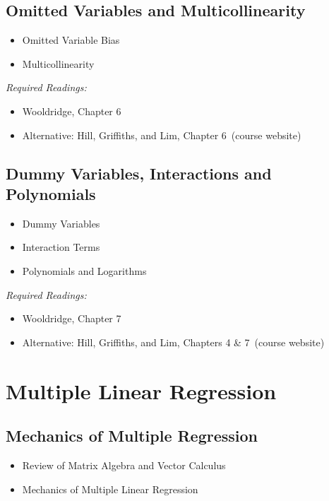 \documentclass[PS]{syllabus}
\newif\ifrelease
\newcommand{\onsite}{\ifrelease\else\ (course website)\fi}
\begin{document}
\begin{syllabus}
\subsection{Omitted Variables and Multicollinearity}
\begin{itemize}
\item Omitted Variable Bias
\item Multicollinearity
\end{itemize}
\textit{Required Readings:} \begin{itemize}
  \item Wooldridge, Chapter 6
      \item Alternative: Hill, Griffiths, and Lim, Chapter 6\onsite
\end{itemize}
\subsection{Dummy Variables, Interactions and Polynomials}
\begin{itemize}
\item Dummy Variables
\item Interaction Terms
\item Polynomials and Logarithms
\end{itemize}
\textit{Required Readings:} \begin{itemize}
  \item Wooldridge, Chapter 7
    \item Alternative: Hill, Griffiths, and Lim, Chapters 4 \& 7\onsite
\end{itemize}



\section{Multiple Linear Regression}
\subsection{Mechanics of Multiple Regression}
\begin{itemize}
\item Review of Matrix Algebra and Vector Calculus
\item Mechanics of Multiple Linear Regression
\end{itemize}

\end{syllabus}
\end{document}
